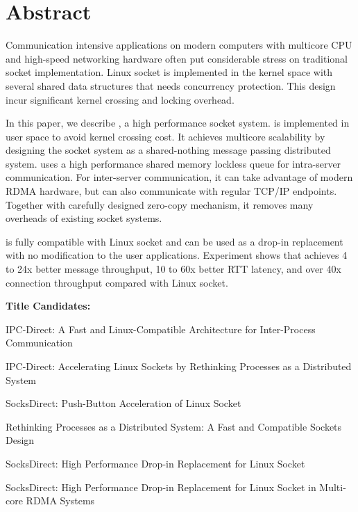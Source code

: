 \section*{Abstract}
Communication intensive applications on modern computers with multicore CPU and high-speed networking hardware 
often put considerable stress on traditional socket implementation. 
Linux socket is implemented in the kernel space with several shared data structures that needs concurrency protection. 
This design incur significant kernel crossing and locking overhead. 

In this paper, we describe \sys{}, a high performance socket system. 
\sys{} is implemented in user space to avoid kernel crossing cost. It achieves multicore scalability 
by designing the socket system as a shared-nothing message passing distributed system.
\sys{} uses a high performance shared memory lockless queue for intra-server communication. For inter-server communication, 
it can take advantage of modern RDMA hardware, but can also communicate with regular TCP/IP endpoints.
Together with carefully designed zero-copy mechanism, it removes many overheads of existing socket systems. 

\sys{} is fully compatible with Linux socket and can be used as a drop-in replacement with no modification to the user applications. 
Experiment shows that \sys achieves 4 to 24x better message throughput, 10 to 60x better RTT latency, and over 40x connection 
throughput compared with Linux socket. 


\iffalse
\textbf{Title Candidates:}


IPC-Direct: A Fast and Linux-Compatible Architecture for Inter-Process Communication



IPC-Direct: Accelerating Linux Sockets by Rethinking Processes as a Distributed System

SocksDirect: Push-Button Acceleration of Linux Socket

Rethinking Processes as a Distributed System: A Fast and Compatible Sockets Design

SocksDirect: High Performance Drop-in Replacement for Linux Socket

SocksDirect: High Performance Drop-in Replacement for Linux Socket in Multi-core RDMA Systems

